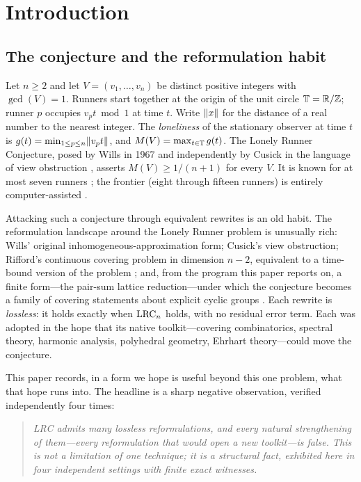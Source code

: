 \section{Introduction}\label{sec:intro}

\subsection{The conjecture and the reformulation habit}

Let $n\ge 2$ and let $V=(v_1,\dots,v_n)$ be distinct positive integers
with $\gcd(V)=1$. Runners start together at the origin of the unit circle
$\mathbb{T}=\mathbb{R}/\mathbb{Z}$; runner $p$ occupies $v_p t \bmod 1$ at time $t$. Write
$\lVert x \rVert$ for the distance of a real number to the nearest integer. The
\emph{loneliness} of the stationary observer at time $t$ is
$g(t)=\min_{1\le p\le n}\lVert v_p t \rVert$, and $M(V)=\max_{t\in\mathbb{T}}g(t)$. The
Lonely Runner Conjecture, posed by Wills in 1967 and independently by
Cusick in the language of view obstruction
\cite{PS-survey,Wills}, asserts $M(V)\ge 1/(n{+}1)$ for every $V$. It is
known for at most seven runners \cite{PS-survey}; the frontier
(eight through fifteen runners) is entirely computer-assisted
\cite{Rosenfeld8,Trakulthongchai,Sungkawichai,Allikvere,MSS}.

Attacking such a conjecture through equivalent rewrites is an old habit.
The reformulation landscape around the Lonely Runner problem is unusually
rich: Wills' original inhomogeneous-approximation form; Cusick's view
obstruction; Rifford's continuous covering problem in dimension $n-2$,
equivalent to a time-bound version of the problem \cite{Rifford}; and, from
the program this paper reports on, a finite form---the pair-sum lattice
reduction---under which the conjecture becomes a family of covering
statements about explicit cyclic groups \cite{PS-survey,prog-artifacts}.
Each rewrite is \emph{lossless}: it holds exactly when $\mathrm{LRC}_n$ holds,
with no residual error term. Each was adopted in the hope that its native
toolkit---covering combinatorics, spectral theory, harmonic analysis,
polyhedral geometry, Ehrhart theory---could move the conjecture.

This paper records, in a form we hope is useful beyond this one problem,
what that hope runs into. The headline is a sharp negative observation,
verified independently four times:

\begin{quote}
\emph{LRC admits many lossless reformulations, and every natural
strengthening of them---every reformulation that would open a new
toolkit---is false. This is not a limitation of one technique; it is a
structural fact, exhibited here in four independent settings with finite
exact witnesses.}
\end{quote}

